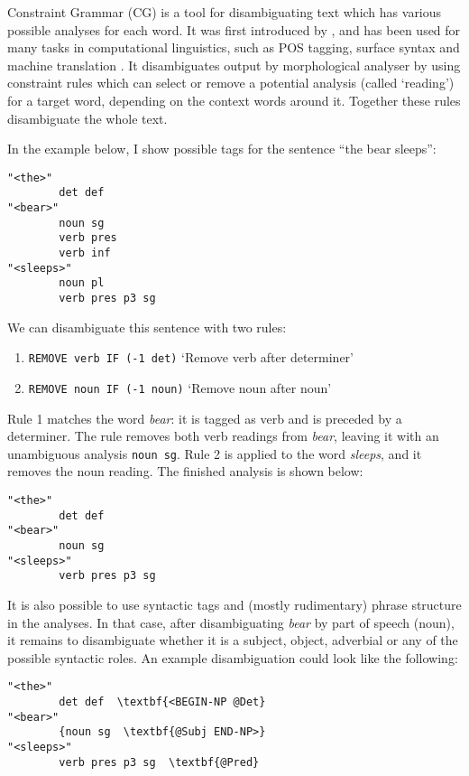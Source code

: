 
Constraint Grammar (CG) is a tool for disambiguating text which has various
possible analyses for each word. It was first introduced by
\cite{karlsson1995constraint}, and has been used for many tasks in
computational linguistics, such as POS tagging, surface syntax and
machine translation \cite{bick2011}. It disambiguates output by
morphological analyser by using
constraint rules which can select or remove a potential analysis
(called `reading') for a
target word, depending on the context words around it. Together these rules disambiguate the whole text.

In the example below, I show possible tags for the sentence ``the bear
sleeps'':


\begin{verbatim}
"<the>"
        det def
"<bear>"
        noun sg
        verb pres
        verb inf
"<sleeps>"
        noun pl
        verb pres p3 sg
\end{verbatim}

\noindent We can disambiguate this sentence with two rules:

\begin{enumerate}
\def\labelenumi{\arabic{enumi}.}
\itemsep1pt\parskip0pt
\item \texttt{REMOVE verb IF (-1 det)}
  `Remove verb after determiner'
\item  \texttt{REMOVE noun IF (-1 noun)}
  `Remove noun after noun'
\end{enumerate}

\noindent Rule 1 matches the word \emph{bear}: it is tagged as verb and is
preceded by a determiner. The rule removes both verb readings from
\emph{bear}, leaving it with an unambiguous analysis \texttt{noun sg}.
Rule 2 is applied to the word \emph{sleeps}, and it removes the noun
reading. The finished analysis is shown below:


\begin{verbatim}
"<the>"
        det def
"<bear>"
        noun sg
"<sleeps>"
        verb pres p3 sg
\end{verbatim}

It is also possible to use syntactic tags and (mostly rudimentary) phrase
structure in the analyses. In that
case, after disambiguating \emph{bear} by part of speech (noun), it
remains to disambiguate whether it is a subject, object, adverbial or
any of the possible syntactic roles. An example disambiguation could
look like the following:


\begin{verbatim}
"<the>"
        det def  \textbf{<BEGIN-NP @Det}
"<bear>"
        {noun sg  \textbf{@Subj END-NP>}
"<sleeps>"
        verb pres p3 sg  \textbf{@Pred}

\end{verbatim}

